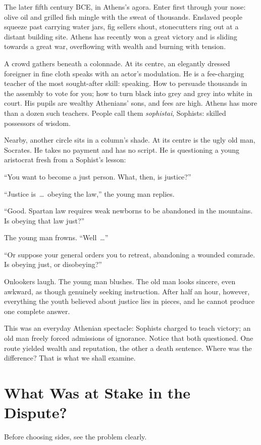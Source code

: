 The later fifth century BCE, in Athens's agora. Enter first through your nose: olive oil and grilled fish mingle with the sweat of thousands. Enslaved people squeeze past carrying water jars, fig sellers shout, stonecutters ring out at a distant building site. Athens has recently won a great victory and is sliding towards a great war, overflowing with wealth and burning with tension.

A crowd gathers beneath a colonnade. At its centre, an elegantly dressed foreigner in fine cloth speaks with an actor's modulation. He is a fee-charging teacher of the most sought-after skill: speaking. How to persuade thousands in the assembly to vote for you; how to turn black into grey and grey into white in court. His pupils are wealthy Athenians' sons, and fees are high. Athens has more than a dozen such teachers. People call them \textit{sophistai}, Sophists: skilled possessors of wisdom.

Nearby, another circle sits in a column's shade. At its centre is the ugly old man, Socrates. He takes no payment and has no script. He is questioning a young aristocrat fresh from a Sophist's lesson:

``You want to become a just person. What, then, is justice?''

``Justice is \,\ldots\, obeying the law,'' the young man replies.

``Good. Spartan law requires weak newborns to be abandoned in the mountains. Is obeying that law just?''

The young man frowns. ``Well \,\ldots''

``Or suppose your general orders you to retreat, abandoning a wounded comrade. Is obeying just, or disobeying?''

Onlookers laugh. The young man blushes. The old man looks sincere, even awkward, as though genuinely seeking instruction. After half an hour, however, everything the youth believed about justice lies in pieces, and he cannot produce one complete answer.

This was an everyday Athenian spectacle: Sophists charged to teach victory; an old man freely forced admissions of ignorance. Notice that both questioned. One route yielded wealth and reputation, the other a death sentence. Where was the difference? That is what we shall examine.

\section{What Was at Stake in the Dispute?}
Before choosing sides, see the problem clearly.

